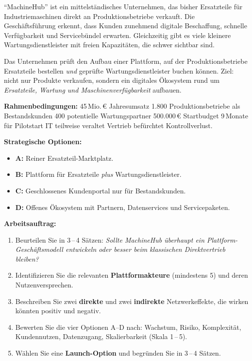 \documentclass[11pt,a4paper,oneside]{article}
\begin{document}
\begin{infobox}
``MachineHub'' ist ein mittelständisches Unternehmen, das bisher Ersatzteile für Industriemaschinen direkt an Produktionsbetriebe verkauft. Die Geschäftsführung erkennt, dass Kunden zunehmend digitale Beschaffung, schnelle Verfügbarkeit und Servicebündel erwarten. Gleichzeitig gibt es viele kleinere Wartungsdienstleister mit freien Kapazitäten, die schwer sichtbar sind.

\smallskip
Das Unternehmen prüft den Aufbau einer Plattform, auf der Produktionsbetriebe Ersatzteile bestellen \emph{und} geprüfte Wartungsdienstleister buchen können. Ziel: nicht nur Produkte verkaufen, sondern ein digitales Ökosystem rund um \emph{Ersatzteile, Wartung und Maschinenverfügbarkeit} aufbauen.

\smallskip
\textbf{Rahmenbedingungen:} 45\,Mio.\,\euro{} Jahresumsatz \textperiodcentered{} 1.800 Produktionsbetriebe als Bestandskunden \textperiodcentered{} 400 potentielle Wartungspartner \textperiodcentered{} 500.000\,\euro{} Startbudget \textperiodcentered{} 9\,Monate für Pilotstart \textperiodcentered{} IT teilweise veraltet \textperiodcentered{} Vertrieb befürchtet Kontrollverlust.

\smallskip
\textbf{Strategische Optionen:}
\begin{itemize}
  \item \textbf{A:} Reiner Ersatzteil-Marktplatz.
  \item \textbf{B:} Plattform für Ersatzteile \emph{plus} Wartungsdienstleister.
  \item \textbf{C:} Geschlossenes Kundenportal nur für Bestandskunden.
  \item \textbf{D:} Offenes Ökosystem mit Partnern, Datenservices und Servicepaketen.
\end{itemize}
\end{infobox}

\noindent\textbf{Arbeitsauftrag:}

\begin{enumerate}
  \item Beurteilen Sie in 3\,--\,4 Sätzen: \emph{Sollte MachineHub überhaupt ein Plattform-Geschäftsmodell entwickeln \textendash{} oder besser beim klassischen Direktvertrieb bleiben?}
  \item Identifizieren Sie die relevanten \textbf{Plattformakteure} (mindestens 5) und deren Nutzenversprechen.
  \item Beschreiben Sie zwei \textbf{direkte} und zwei \textbf{indirekte} Netzwerkeffekte, die wirken könnten \textendash{} positiv und negativ.
  \item Bewerten Sie die vier Optionen A--D nach: Wachstum, Risiko, Komplexität, Kundennutzen, Datenzugang, Skalierbarkeit (Skala 1\,--\,5).
  \item Wählen Sie eine \textbf{Launch-Option} und begründen Sie in 3\,--\,4 Sätzen.
\end{enumerate}
\end{document}
